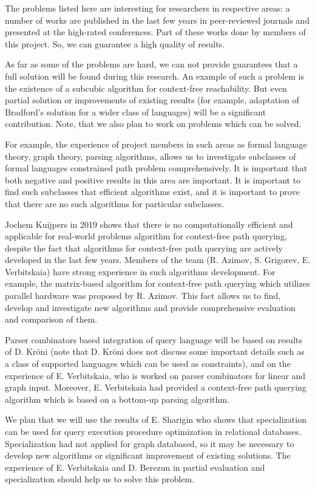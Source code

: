 \documentclass[12pt]{article}  %
\theoremstyle{remark}
\begin{document}
The problems listed here are interesting for researchers in respective areas: a number of works are published in the last few years in peer-reviewed journals and presented at the high-rated conferences. Part of these works done by members of this project. So, we can guarantee a high quality of results.

As far as some of the problems are hard, we can not provide guarantees that a full solution will be found during this research. An example of such a problem is the existence of a subcubic algorithm for context-free reachability. But even partial solution or improvements of existing results (for example, adaptation of Bradford's solution for a wider class of languages) will be a significant contribution. Note, that we also plan to work on problems which can be solved.

For example, the experience of project members in such areas as formal language theory, graph theory, parsing algorithms, allows us to investigate subclasses of formal languages constrained path problem comprehensively. It is important that both negative and positive results in this area are important. It is important to find such subclasses that efficient algorithms exist, and it is important to prove that there are no such algorithms for particular subclasses.

Jochem Kuijpers in 2019 shows that there is no computationally efficient and applicable for real-world problems algorithm for context-free path querying, despite the fact that algorithms for context-free path querying are actively developed in the last few years.
Members of the team (R. Azimov, S. Grigorev, E. Verbitskaia) have strong experience in such algorithms development. For example, the matrix-based algorithm for context-free path querying which utilizes parallel hardware was proposed by R. Azimov. This fact allows us to find, develop and investigate new algorithms and provide comprehensive evaluation and comparison of them.

Parser combinators based integration of query language will be based on results of D. Kröni (note that D. Kröni does not discuss some important details such as a class of supported languages which can be used as constraints), and on the experience of E. Verbitskaia, who is worked on parser combinators for linear and graph input. Moreover, E. Verbitskaia had provided a context-free path querying algorithm which is based on a bottom-up parsing algorithm.

We plan that we will use the results of E. Sharigin who shows that specialization can be used for query execution procedure optimization in relational databases. Specialization had not applied for graph databased, so it may be necessary to develop new algorithms or significant improvement of existing solutions. The experience of E. Verbitskaia and D. Berezun in partial evaluation and specialization should help us to solve this problem.
\end{document}
